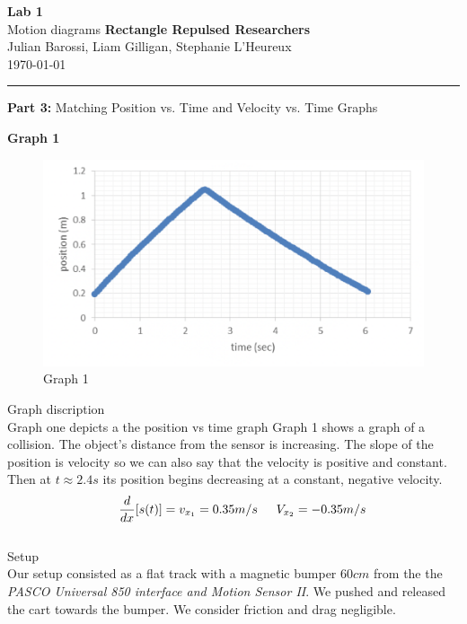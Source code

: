 \documentclass[12pt, letterpaper]{article}
\begin{document}
  \begin{titlepage} 
    \begin{center}
      \Huge{\textbf{Lab 1}}\\
      \Huge{Motion diagrams}
      \vfill
      \large{\textbf{Rectangle Repulsed Researchers}}\\
      \large{Julian Barossi, Liam Gilligan, Stephanie L'Heureux}\\
      \vspace*{0.5cm}
      \normalsize
      \today
    \end{center}
  \end{titlepage}

  \begin{center}
    \rule{\textwidth}{0.5pt}
    \normalsize{\textbf{Part 3:} Matching Position vs. Time and Velocity vs. Time Graphs}\\
    \vspace{0.5cm}
  \end{center}

  \begin{center}
    \Large\textbf{{Graph 1}}\\
  \end{center}

  \begin{figure}[H]
    \centering 
    \includegraphics[width=\linewidth]{graph_1.png}
    \caption{Graph 1}
    \label{fig:boat1}
  \end{figure}


  \large{Graph discription}\\
  Graph one depicts a the position vs time graph 
  Graph 1 shows a graph of a collision. The object's distance from the sensor 
  is increasing. The slope of the position is velocity so we can also say 
  that the velocity is positive and constant. Then at $t\approx2.4s$ its position
  begins decreasing at a constant, negative velocity.\\ 
  \begin{equation} 
    \indent{} \frac{d}{dx}[s(t)] =  v_{x_1} = 0.35m/s
    \indent{}V_{x_2}= -0.35m/s
  \end{equation}\\
  \large{Setup}\\
  Our setup consisted as a flat track with a magnetic bumper $60cm$ from the
  the \emph{PASCO Universal 850 interface and Motion Sensor II}. We pushed and released the cart towards the bumper. 
  We consider friction and drag negligible.\\
\end{document}
